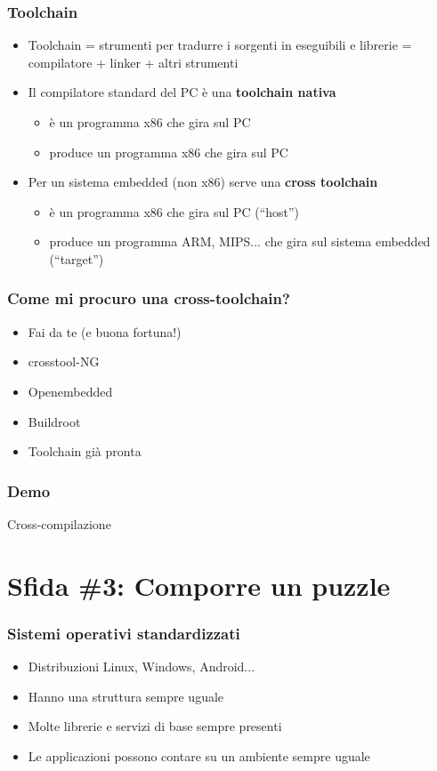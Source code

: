 \documentclass[xetex,table]{beamer}
\begin{document}
\begin{frame}
\frametitle{Toolchain}
  \begin{itemize}
  \item Toolchain = strumenti per tradurre i sorgenti in eseguibili e
    librerie = compilatore + linker + altri strumenti
  \item Il compilatore standard del PC è una {\bf toolchain nativa}
    \begin{itemize}
    \item è un programma x86 che gira sul PC
    \item produce un programma x86 che gira sul PC
    \end{itemize}
  \item Per un sistema embedded (non x86) serve una {\bf cross
    toolchain}
    \begin{itemize}
    \item è un programma x86 che gira sul PC (``host'')
    \item produce un programma ARM, MIPS... che gira sul sistema
      embedded (``target'')
    \end{itemize}
  \end{itemize}
\end{frame}

\begin{frame}
\frametitle{Come mi procuro una cross-toolchain?}
  \begin{itemize}
  \item Fai da te (e buona fortuna!)
  \item crosstool-NG
  \item Openembedded
  \item Buildroot
  \item Toolchain già pronta
  \end{itemize}
\end{frame}

\begin{frame}
\frametitle[Demo! Cross-compilazione]{Demo}
  \begin{center}
    \LARGE
    Cross-compilazione
  \end{center}
\end{frame}

\section{Sfida \#3: Comporre un puzzle}

\begin{frame}
\frametitle{Sistemi operativi standardizzati}
  \begin{itemize}
  \item Distribuzioni Linux, Windows, Android...
  \item Hanno una struttura sempre uguale
  \item Molte librerie e servizi di base sempre presenti
  \item Le applicazioni possono contare su un ambiente sempre uguale
  \end{itemize}
\end{frame}
\end{document}
